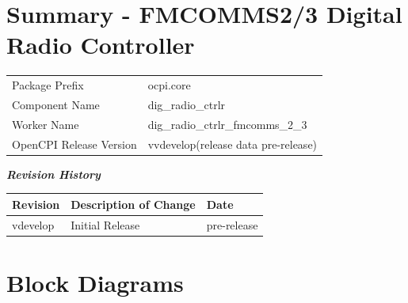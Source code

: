 \documentclass{article}
\author{} %
\date{Version \docVersion} %
\title{\docTitle}
\def\docVersion{\color{red}vdevelop}
\def\comp{dig\_radio\_ctrlr\_fmcomms\_2\_3}
\def\Comp{FMCOMMS2/3 Digital Radio Controller}
\begin{document}
\section*{Summary - \Comp}
\begin{longtable}{|p{4cm}|p{12.84cm}|}
	\hline
	\rowcolor{blue}
	                  &                                        \\
	\hline
	Package Prefix    & ocpi.core \\
	\hline
	Component Name    & dig\_radio\_ctrlr \\
	\hline
	Worker Name       & \comp                                  \\
	\hline
	OpenCPI Release Version & v\docVersion (release data \color{red}pre-release) \\
	\hline
\end{longtable}

\begin{center}
  \textit{\textbf{Revision History}}
  \begin{longtable}{|p{2cm}|p{12cm}|p{2.4cm}|}
    \hline
    \rowcolor{blue}
    \textbf{Revision} & \textbf{Description of Change} & \textbf{Date} \\
    \hline
    \color{red}vdevelop & Initial Release & \color{red}pre-release \\
    \hline
  \end{longtable}
\end{center}

\section{Block Diagrams}
\end{document}
